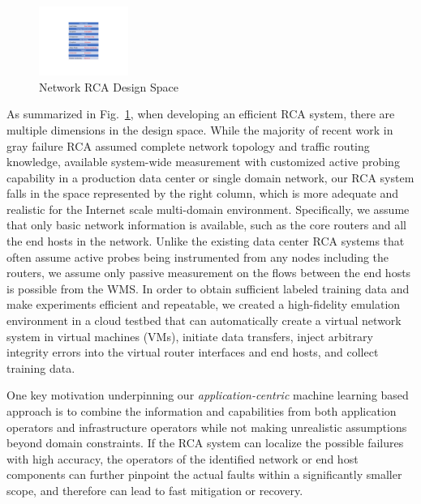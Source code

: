 \begin{figure}
  \begin{center}
    \includegraphics[width=0.26\textwidth]{./figure/RCADesignSpace}
  \end{center}
\caption{Network RCA Design Space}
\label{fig:designspace}
\end{figure}

As summarized in Fig.~\ref{fig:designspace}, when developing an efficient RCA system, there are multiple dimensions in the design space. While the majority of recent work in 
gray failure RCA assumed complete network topology and traffic routing knowledge, available system-wide measurement with customized active probing capability in a production 
data center or single domain network, our RCA system falls in the space represented by the right column, which is more adequate and realistic for the Internet scale multi-domain 
environment. Specifically, we assume that only basic network information is available, such as the core routers and all the end hosts in the network. 
Unlike the existing data center RCA systems that often assume active probes being instrumented from any nodes including the routers, 
we assume only passive measurement on the flows between the end hosts is possible from the WMS. In order to obtain sufficient labeled training data and make experiments efficient and repeatable, 
we created a high-fidelity emulation environment in a cloud testbed that can automatically create a virtual network system in virtual machines (VMs), initiate data transfers, inject arbitrary integrity 
errors into the virtual router interfaces and end hosts, and collect training data.

One key motivation underpinning our {\it application-centric} machine learning based approach is to combine the information and capabilities from both application operators and infrastructure operators while not
making unrealistic assumptions beyond domain constraints. If the RCA system can localize the possible failures with high accuracy, the operators of the identified network or end host components can further pinpoint the actual faults within 
a significantly smaller scope, and therefore can lead to fast mitigation or recovery.   

